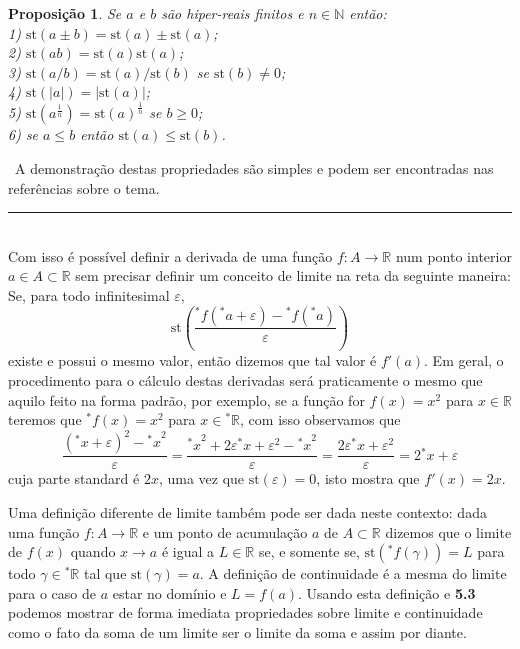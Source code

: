 \documentclass[11pt,a4paper]{article}
\newtheorem{prop}[mydef]{Proposição}
\def\dem{\par\smallbreak\noindent {\textit{ Demonstração:}} \ }
\def\eop{\hfill\rule{2.5mm}{2.5mm} \\ }
\theoremstyle{definition}
\begin{document}
\begin{prop}
	
	Se $a$ e $b$ são hiper-reais finitos e $n\in\mathbb{N}$ então: \\
	
	1) $\text{st}(a\pm b)=\text{st}(a)\pm\text{st}(a) $; \\
	
	2) $\text{st}(ab)=\text{st}(a)\text{st}(a)$; \\
	
	3) $\text{st}(a/b)=\text{st}(a)/\text{st}(b)$ se $\text{st}(b)\neq 0$;\\
	
	4) $\text{st}(|a|)=|\text{st}(a)|$;\\
	
	5) $\text{st}(a^{\frac{1}{n}})=\text{st}(a)^{\frac{1}{n}}$ se $b\geq 0$;\\
	
	6) se $a\leq b$ então $\text{st}(a) \leq \text{st}(b)$.	
	
\end{prop}



\dem A demonstração destas propriedades são simples e podem ser encontradas nas referências sobre o tema. \eop

Com isso é possível definir a derivada de uma função $f:A\rightarrow \mathbb{R}$ num ponto interior $a \in A\subset\mathbb{R}$ sem precisar definir um conceito de limite na reta da seguinte maneira: Se, para todo infinitesimal $\varepsilon$, $$\text{st}\left(\frac{{^*f}({^*a}+\varepsilon)-{^*f}({^*a})}{\varepsilon}\right)$$ existe e possui o mesmo valor, então dizemos que tal valor é $f'(a)$. Em geral, o procedimento para o cálculo destas derivadas será praticamente o mesmo que aquilo feito na forma padrão, por exemplo, se a função for $f(x)=x^2$ para $x\in \mathbb{R}$ teremos que ${^*f(x)=x^2}$ para $x\in {^* \mathbb{R}}$, com isso observamos que $$\frac{({^*x}+\varepsilon)^2 - {^*x} ^2}{\varepsilon}=\frac{{^*x}^2+2\varepsilon{^*x} +\varepsilon^2 -{^*x}^2}{\varepsilon}=\frac{2\varepsilon{^*x} +\varepsilon^2 }{\varepsilon}=2{^*x}+\varepsilon$$ cuja parte standard é $2x$, uma vez que $\text{st}(\varepsilon)=0$, isto mostra que $f'(x)=2x$.

Uma definição diferente de limite também pode ser dada neste contexto: dada uma função $f:A\rightarrow \mathbb{R}$ e um ponto de acumulação $a$ de $A\subset \mathbb{R}$ dizemos que o limite de $f(x)$ quando $x\rightarrow a$ é igual a $L\in \mathbb{R}$ se, e somente se, $\text{st}({^*f}(\gamma))=L$ para todo $\gamma\in{^*\mathbb{R}}$ tal que $\text{st}(\gamma)=a$. A definição de continuidade é a mesma do limite para o caso de $a$ estar no domínio e $L=f(a)$. Usando esta definição e \textbf{5.3} podemos mostrar de forma imediata propriedades sobre limite e continuidade como o fato da soma de um limite ser o limite da soma e assim por diante.    
\end{document}
